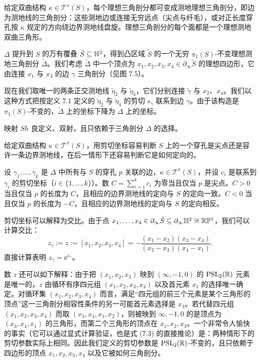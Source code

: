 给定双曲结构 $\kappa\in\mathcal{T}^x(S)$，每个理想三角剖分都可变成测地理想三角剖分，即边为测地线的三角剖分：这些测地边或连接无穷远点（尖点与纤毛），或对正长度穿孔按 $\kappa$ 规定的方向绕边界测地线盘旋。理想三角剖分的每个面都是一个理想测地双曲三角形。

$\Delta$ 提升到 $S$ 的万有覆叠 $\tilde S\subseteq\mathbb{H}^2$，得到凸区域 $\tilde S$ 的一个无穷 $\pi_1(S)$-不变理想测地三角剖分 $\tilde\Delta$。我们考虑 $\tilde\Delta$ 中一个顶点为 $x_1,x_2,x_3,x_4\in\partial_\infty\tilde S$ 的理想四边形，它由连接 $x_1$ 与 $x_3$ 的边 $\gamma$ 三角剖分（见图 7.5）。

现在我们取唯一的两条正交测地线 $\tilde\eta_2$ 与 $\tilde\eta_4$，它们分别连接 $\tilde\gamma$ 与 $x_2$、$x_4$。我们以这种方式把按定义 7.1 定义的 $\tilde\eta_2$ 与 $\tilde\eta_4$ 的剪切 $s_\gamma$ 联系到边 $\gamma$。由于该构造是 $\pi_1(S)$-不变的，$\tilde\Delta$ 上的坐标下降为 $\Delta$ 上的坐标。

\begin{theorem}[7.5（剪切坐标，{{{{{{[261, Prop. 7.4.9]}}}}}}）] 映射 $Sh$ 良定义、双射，且只依赖于三角剖分 $\Delta$ 的选择。\end{theorem}

给定双曲结构 $\kappa\in\mathcal{T}^x(S)$，用剪切坐标容易判断 $S$ 上的一个穿孔是尖点还是容许一条边界测地线，在后一情形下还容易判断它是如何定向的。


\begin{proposition}[7.6（{{{{{{[261, Sects. 7.4.4-7.4.5]}}}}}}）] 设 $\gamma_1,\dots,\gamma_k$ 是 $\Delta$ 中所有与 $S$ 的穿孔 $p$ 关联的边，$\kappa\in\mathcal{T}^x(S)$，并设 $c_i$ 是联系到 $\gamma_i$ 的剪切坐标（$i\in\{1,\dots,k\}$）。数 $C=\sum_{i=1}^k c_i$ 为零当且仅当 $p$ 是尖点。$C>0$ 当且仅当 $p$ 的长度为 $C$，且相应的边界测地线的定向与 $S$ 的定向一致。$C<0$ 当且仅当 $p$ 的长度为 $-C$，且相应的边界测地线的定向与 $S$ 的定向相反。\end{proposition}

剪切坐标可以解释为交比。由于点 $x_1,\dots,x_4\in\partial_\infty\tilde S\subseteq\partial_\infty\mathbb{H}^2\cong\mathbb{R}\mathbb{P}^1$，我们可以计算交比：
\begin{equation}
z_\gamma:=z:=[x_1,x_2,x_3,x_4]=-\frac{(x_1-x_2)(x_3-x_4)}{(x_2-x_3)(x_4-x_1)}.
\tag{7.3}
\end{equation}
直接计算表明 $z_\gamma=\ee^{s_\gamma}$。

数 $z$ 还可以如下解释：由于把 $(x_1,x_2,x_3)$ 映到 $(\infty,-1,0)$ 的 $\operatorname{PSL}_2(\mathbb{R})$ 元素是唯一的，$z$ 由循环有序四元组 $(x_1,x_2,x_3,x_4)$ 以及首元素 $x_1$ 的选择唯一确定。对循环集 $(x_1,x_2,x_3,x_4)$ 而言，满足“四元组的前三个元素是某个三角形的顶点”这一三角剖分相容性条件的另一可能首元素选择是 $x_3$。若代替四元组 $(x_1,x_2,x_3,x_4)$ 而取 $(x_3,x_4,x_1,x_2)$，则被映到 $\infty,-1,0$ 的是顶点为 $(x_3,x_4,x_1)$ 的三角形，而第二个三角形的顶点在 $x_1,x_2,x_3$。一个非常令人愉快的事实（它可以通过显式计算验证，也是式 (7.3) 的直接推论）是：两种情形下的剪切参数实际上相同。因此我们定义的剪切参数是 $\operatorname{PSL}_2(\mathbb{R})$-不变的，且只依赖于四边形的顶点 $x_1,x_2,x_3,x_4$ 以及它被如何三角剖分。

